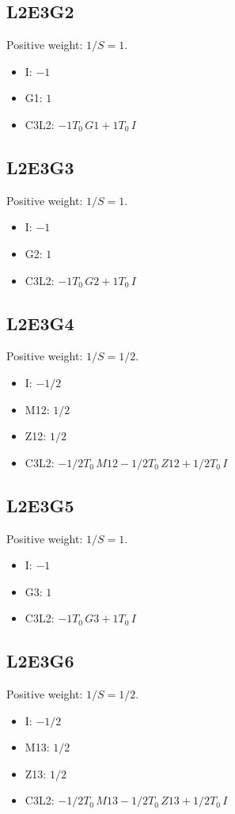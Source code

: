 \documentclass{article}
\begin{document}
\subsection*{L2E3G2}

Positive weight: $1/S=1$.
\begin{itemize}
\item I: $- 1$
\item G1: $1$
\item C3L2: $- 1 T_0\,G1 + 1 T_0\,I$
\end{itemize}
\subsection*{L2E3G3}

Positive weight: $1/S=1$.
\begin{itemize}
\item I: $- 1$
\item G2: $1$
\item C3L2: $- 1 T_0\,G2 + 1 T_0\,I$
\end{itemize}
\subsection*{L2E3G4}

Positive weight: $1/S=1/2$.
\begin{itemize}
\item I: $- 1/2$
\item M12: $1/2$
\item Z12: $1/2$
\item C3L2: $- 1/2 T_0\,M12 - 1/2 T_0\,Z12 + 1/2 T_0\,I$
\end{itemize}
\subsection*{L2E3G5}

Positive weight: $1/S=1$.
\begin{itemize}
\item I: $- 1$
\item G3: $1$
\item C3L2: $- 1 T_0\,G3 + 1 T_0\,I$
\end{itemize}
\subsection*{L2E3G6}

Positive weight: $1/S=1/2$.
\begin{itemize}
\item I: $- 1/2$
\item M13: $1/2$
\item Z13: $1/2$
\item C3L2: $- 1/2 T_0\,M13 - 1/2 T_0\,Z13 + 1/2 T_0\,I$
\end{itemize}
\end{document}
